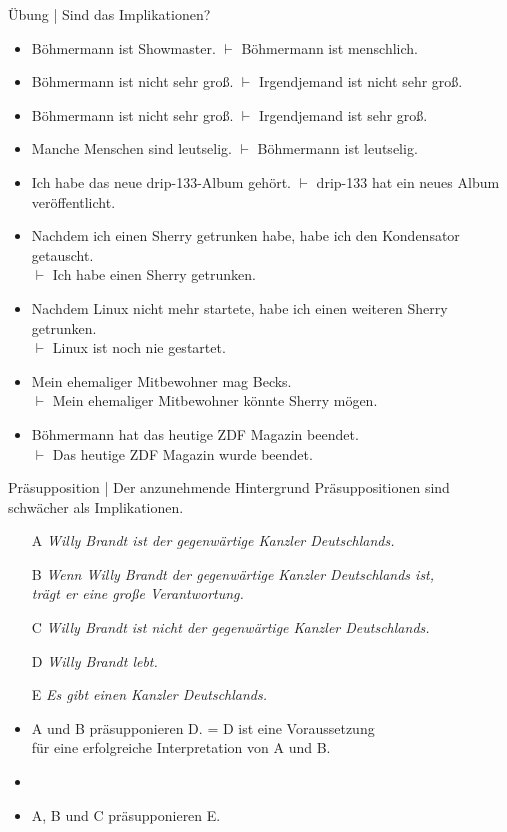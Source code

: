 \begin{frame}
  {Übung | Sind das Implikationen?}
  \begin{itemize}[<+->]\small
    \item Böhmermann ist Showmaster. $\vdash$ Böhmermann ist menschlich.
    \item Böhmermann ist nicht sehr groß. $\vdash$ Irgendjemand ist nicht sehr groß.
    \item Böhmermann ist nicht sehr groß. $\vdash$ Irgendjemand ist sehr groß.
    \item Manche Menschen sind leutselig. $\vdash$ Böhmermann ist leutselig.
    \item Ich habe das neue drip-133-Album gehört. $\vdash$ drip-133 hat ein neues Album veröffentlicht.
    \item Nachdem ich einen Sherry getrunken habe, habe ich den Kondensator getauscht.\\
      $\vdash$ Ich habe einen Sherry getrunken.
    \item Nachdem Linux nicht mehr startete, habe ich einen weiteren Sherry getrunken.\\
      $\vdash$ Linux ist noch nie gestartet.
    \item Mein ehemaliger Mitbewohner mag Becks.\\
      $\vdash$ Mein ehemaliger Mitbewohner könnte Sherry mögen.
    \item Böhmermann hat das heutige ZDF Magazin beendet.\\
      $\vdash$ Das heutige ZDF Magazin wurde beendet.
  \end{itemize}
\end{frame}

\begin{frame}
  {Präsupposition | Der anzunehmende Hintergrund}
  \onslide<+->
  \onslide<+->
  Präsuppositionen sind schwächer als Implikationen.\\
  \Zeile
  \begin{itemize}[<+->]
    \item[A] \textit{Willy Brandt ist der gegenwärtige Kanzler Deutschlands.}
    \item[B] \textit{Wenn Willy Brandt der gegenwärtige Kanzler Deutschlands ist,\\
      trägt er eine große Verantwortung.}
    \item[C] \textit{Willy Brandt ist nicht der gegenwärtige Kanzler Deutschlands.}
    \item[D] \textit{Willy Brandt lebt.}
    \item[E] \textit{Es gibt einen Kanzler Deutschlands.}
      \Halbzeile
    \item \alert{A und B präsupponieren D.} = D ist eine Voraussetzung\\
      für eine erfolgreiche Interpretation von A und B.
    \item {}
    \item \alert{A, B und C präsupponieren E.}
  \end{itemize}
\end{frame}

